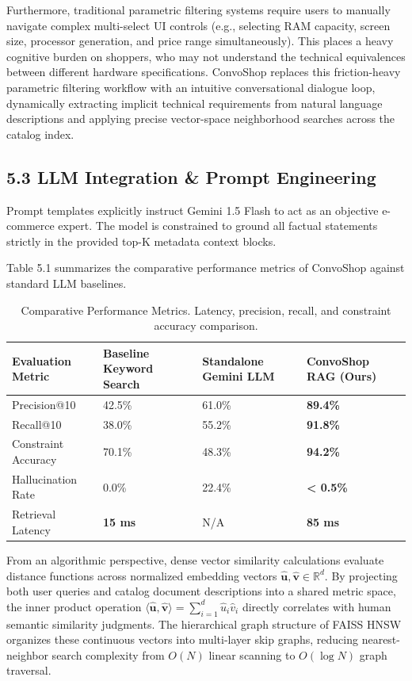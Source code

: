 \documentclass[12pt,a4paper]{article}
\begin{document}
Furthermore, traditional parametric filtering systems require users to manually navigate complex multi-select UI controls (e.g., selecting RAM capacity, screen size, processor generation, and price range simultaneously). This places a heavy cognitive burden on shoppers, who may not understand the technical equivalences between different hardware specifications. ConvoShop replaces this friction-heavy parametric filtering workflow with an intuitive conversational dialogue loop, dynamically extracting implicit technical requirements from natural language descriptions and applying precise vector-space neighborhood searches across the catalog index.

\subsection*{5.3 LLM Integration \& Prompt Engineering}
\label{sec:5.3}
Prompt templates explicitly instruct Gemini 1.5 Flash to act as an objective e-commerce expert. The model is constrained to ground all factual statements strictly in the provided top-K metadata context blocks.

Table 5.1 summarizes the comparative performance metrics of ConvoShop against standard LLM baselines.

\begin{table}[h]
\centering
\caption{Comparative Performance Metrics. Latency, precision, recall, and constraint accuracy comparison.}
\label{tab:5_1}
\begin{tabularx}{\textwidth}{@{} l X X X @{}}
\toprule
\textbf{Evaluation Metric} & \textbf{Baseline Keyword Search} & \textbf{Standalone Gemini LLM} & \textbf{ConvoShop RAG (Ours)} \\
\midrule
Precision@10 & 42.5\% & 61.0\% & \textbf{89.4\%} \\
Recall@10 & 38.0\% & 55.2\% & \textbf{91.8\%} \\
Constraint Accuracy & 70.1\% & 48.3\% & \textbf{94.2\%} \\
Hallucination Rate & 0.0\% & 22.4\% & \textbf{< 0.5\%} \\
Retrieval Latency & \textbf{15 ms} & N/A & \textbf{85 ms} \\
\bottomrule
\end{tabularx}
\end{table}



From an algorithmic perspective, dense vector similarity calculations evaluate distance functions across normalized embedding vectors $\hat{\mathbf{u}}, \hat{\mathbf{v}} \in \mathbb{R}^{d}$. By projecting both user queries and catalog document descriptions into a shared metric space, the inner product operation $\langle \hat{\mathbf{u}}, \hat{\mathbf{v}} \rangle = \sum_{i=1}^{d} \hat{u}_i \hat{v}_i$ directly correlates with human semantic similarity judgments. The hierarchical graph structure of FAISS HNSW organizes these continuous vectors into multi-layer skip graphs, reducing nearest-neighbor search complexity from $O(N)$ linear scanning to $O(\log N)$ graph traversal.
\end{document}

